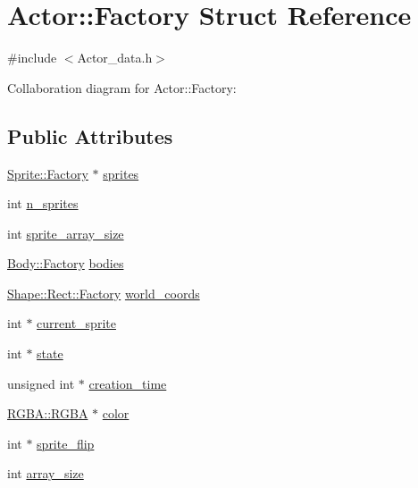 \hypertarget{struct_actor_1_1_factory}{}\section{Actor\+:\+:Factory Struct Reference}
\label{struct_actor_1_1_factory}


{\ttfamily \#include $<$Actor\+\_\+data.\+h$>$}



Collaboration diagram for Actor\+:\+:Factory\+:
\subsection*{Public Attributes}
\begin{DoxyCompactItemize}
\item 
\mbox{\hyperlink{struct_sprite_1_1_factory}{Sprite\+::\+Factory}} $\ast$ \mbox{\hyperlink{struct_actor_1_1_factory_a18ce1413dd0b29ed6aef0a06c6105739}{sprites}}
\item 
int \mbox{\hyperlink{struct_actor_1_1_factory_a6acfbc8083b391ccfa5d674b8fad182f}{n\+\_\+sprites}}
\item 
int \mbox{\hyperlink{struct_actor_1_1_factory_a1b816237202d5281fc6206ba34253909}{sprite\+\_\+array\+\_\+size}}
\item 
\mbox{\hyperlink{struct_body_1_1_factory}{Body\+::\+Factory}} \mbox{\hyperlink{struct_actor_1_1_factory_acce06e3a66de54417f47ae382e589dac}{bodies}}
\item 
\mbox{\hyperlink{struct_shape_1_1_rect_1_1_factory}{Shape\+::\+Rect\+::\+Factory}} \mbox{\hyperlink{struct_actor_1_1_factory_a1e08690a49b6594d2e78089ce3bc9362}{world\+\_\+coords}}
\item 
int $\ast$ \mbox{\hyperlink{struct_actor_1_1_factory_ac4250cfd7b0d5a2ff3efe7afe7ff72e0}{current\+\_\+sprite}}
\item 
int $\ast$ \mbox{\hyperlink{struct_actor_1_1_factory_a6c786b3ba6c2e37c5ae1ba949e34294a}{state}}
\item 
unsigned int $\ast$ \mbox{\hyperlink{struct_actor_1_1_factory_a9f4a71c32bfdfa7b54ca9c21dfca986e}{creation\+\_\+time}}
\item 
\mbox{\hyperlink{struct_r_g_b_a_1_1_r_g_b_a}{R\+G\+B\+A\+::\+R\+G\+BA}} $\ast$ \mbox{\hyperlink{struct_actor_1_1_factory_a56f0e8cb06ebc3614c804b9cdf60f1c6}{color}}
\item 
int $\ast$ \mbox{\hyperlink{struct_actor_1_1_factory_a5ad6ac256a937b856a061db16b2f6e04}{sprite\+\_\+flip}}
\item 
int \mbox{\hyperlink{struct_actor_1_1_factory_aaeade2278a85832295928fc45eca276e}{array\+\_\+size}}
\end{DoxyCompactItemize}


